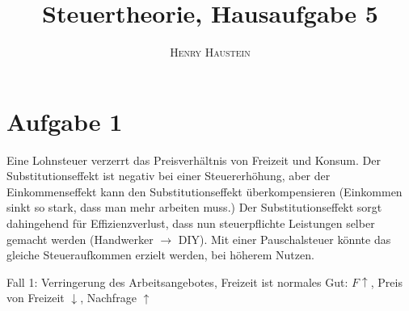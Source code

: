\documentclass{article}
\title{\textbf{Steuertheorie, Hausaufgabe 5}}
\author{\textsc{Henry Haustein}}
\date{}
\begin{document}
	\maketitle
	
	\section*{Aufgabe 1}
	Eine Lohnsteuer verzerrt das Preisverhältnis von Freizeit und Konsum. Der Substitutionseffekt ist negativ bei einer Steuererhöhung, aber der Einkommenseffekt kann den Substitutionseffekt überkompensieren (Einkommen sinkt so stark, dass man mehr arbeiten muss.) Der Substitutionseffekt sorgt dahingehend für Effizienzverlust, dass nun steuerpflichte Leistungen selber gemacht werden (Handwerker $\to$ DIY). Mit einer Pauschalsteuer könnte das gleiche Steueraufkommen erzielt werden, bei höherem Nutzen.
	
	Fall 1: Verringerung des Arbeitsangebotes, Freizeit ist normales Gut: $F\uparrow$, Preis von Freizeit $\downarrow$, Nachfrage $\uparrow$
	
\end{document}
